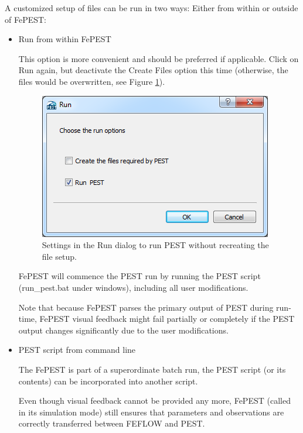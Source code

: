 A customized setup of files can be run in two ways: Either from within or outside of FePEST:

\begin{itemize}
\item Run from within FePEST

This option is more convenient and should be preferred if applicable. Click on Run again, but deactivate the Create Files option this time (otherwise, the files would be overwritten, see Figure \ref{fig:fepest:RunDialogRunOnly}).

\begin{figure}
	\center
	\includegraphics[width=\columnwidth]{figures/RunDialogRunOnly.png}
\caption{Settings in the Run dialog to run PEST without recreating the file setup.}
\label{fig:fepest:RunDialogRunOnly}
\end{figure}

FePEST will commence the PEST run by running the PEST script (run\_pest.bat under windows), including all user modifications.

Note that because FePEST parses the primary output of PEST during run-time, FePEST visual feedback might fail partially or completely if the PEST output changes significantly due to the user modifications.

\item PEST script from command line

The FePEST is part of a superordinate batch run, the PEST script (or its contents) can be incorporated into another script.

Even though visual feedback cannot be provided any more, FePEST (called in its simulation mode) still ensures that parameters and observations are correctly transferred between FEFLOW and PEST.
\end{itemize}


